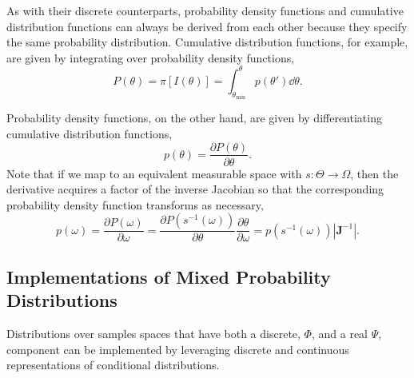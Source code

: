 As with their discrete counterparts, probability density functions 
and cumulative distribution functions can always be derived from
each other because they specify the same probability distribution.  
Cumulative distribution functions, for example, are given by 
integrating over probability density functions,
%
\begin{equation*}
P \! \left( \theta \right)
= \pi \! \left[ I \! \left( \theta \right) \right]
= \int_{\theta_{\min}}^{\theta} p \! \left( \theta' \right) \dd \theta.
\end{equation*}

Probability density functions, on the other hand, are given by 
differentiating cumulative distribution functions,
%
\begin{equation*}
p \! \left( \theta \right) = 
\frac{\partial P \! \left( \theta \right) }{ \partial \theta}.
\end{equation*}
%
Note that if we map to an equivalent measurable space with 
$s : \Theta \rightarrow \Omega$, then the derivative
acquires a factor of the inverse Jacobian so that the
corresponding probability density function transforms
as necessary,
%
\begin{equation*}
p \! \left( \omega \right) 
= 
\frac{\partial P \! \left( \omega \right) }{ \partial \omega}
=
\frac{\partial P \! \left( s^{-1} \! \left( \omega \right) \right) }
{ \partial \theta}
\frac{ \partial \theta }{ \partial \omega }
= 
p \! \left( s^{-1} \! \left( \omega \right) \right) \left| \mathbf{J}^{-1} \right|.
\end{equation*}

\subsection{Implementations of Mixed Probability Distributions}

Distributions over samples spaces that have both a discrete, $\Phi$,
and a real $\Psi$, component can be implemented by leveraging 
discrete and continuous representations of conditional distributions.  

